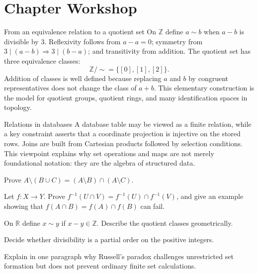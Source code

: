 \section{Chapter Workshop}

\begin{workedexample}{From an equivalence relation to a quotient set}
On $\mathbb{Z}$ define $a\sim b$ when $a-b$ is divisible by $3$. Reflexivity follows from $a-a=0$; symmetry from $3\mid(a-b)\Rightarrow3\mid(b-a)$; and transitivity from addition. The quotient set has three equivalence classes:
\[
    \mathbb{Z}/\!\sim=\{[0],[1],[2]\}.
\]
Addition of classes is well defined because replacing $a$ and $b$ by congruent representatives does not change the class of $a+b$. This elementary construction is the model for quotient groups, quotient rings, and many identification spaces in topology.
\end{workedexample}

\begin{applicationbox}{Relations in databases}
A database table may be viewed as a finite relation, while a key constraint asserts that a coordinate projection is injective on the stored rows. Joins are built from Cartesian products followed by selection conditions. This viewpoint explains why set operations and maps are not merely foundational notation: they are the algebra of structured data.
\end{applicationbox}

\begin{chapterexercises}
    \item Prove $A\setminus(B\cup C)=(A\setminus B)\cap(A\setminus C)$.
    \item Let $f:X\to Y$. Prove $f^{-1}(U\cap V)=f^{-1}(U)\cap f^{-1}(V)$, and give an example showing that $f(A\cap B)=f(A)\cap f(B)$ can fail.
    \item On $\mathbb{R}$ define $x\sim y$ if $x-y\in\mathbb{Z}$. Describe the quotient classes geometrically.
    \item Decide whether divisibility is a partial order on the positive integers.
    \item Explain in one paragraph why Russell's paradox challenges unrestricted set formation but does not prevent ordinary finite set calculations.
\end{chapterexercises}

